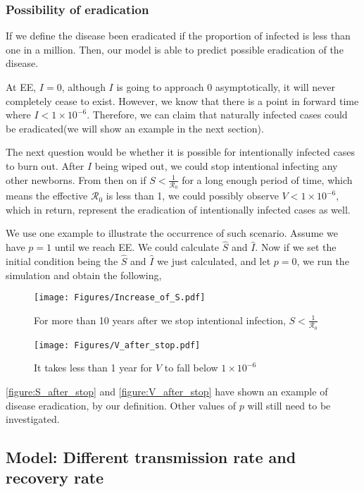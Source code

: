 \documentclass[12pt]{article}
\newcommand{\R}{\mathcal{R}}
\begin{document}
\subsubsection{Possibility of eradication}
If we define the disease been eradicated if the proportion of infected is less than one in a million. Then, our model is able to predict possible eradication of the disease.

At EE, $I=0$, although $I$ is going to approach 0 asymptotically, it will never completely cease to exist. However, we know that there is a point in forward time where $I<1\times10^{-6}$. Therefore, we can claim that naturally infected cases could be eradicated(we will show an example in the next section).

The next question would be whether it is possible for intentionally infected cases to burn out. After $I$ being wiped out, we could stop intentional infecting any other newborns. From then on if $S<\frac{1}{\R_0}$ for a long enough period of time, which means the effective $\R_0$ is less than 1, we could possibly observe $V<1\times10^{-6}$, which in return, represent the eradication of intentionally infected cases as well.

We use one example to illustrate the occurrence of such scenario. Assume we have $p=1$ until we reach EE. We could calculate $\hat{S}$ and $\hat{I}$. Now if we set the initial condition being the $\hat{S}$ and $\hat{I}$ we just calculated, and let $p=0$, we run the simulation and obtain the following,
\begin{figure}[H]
  \centering
  \texttt{[image: Figures/Increase\_of\_S.pdf]}
  \caption{For more than 10 years after we stop intentional infection, $S<\frac{1}{\R_0}$}
\label{figure:S_after_stop}
\end{figure}

\begin{figure}[H]
  \centering
  \texttt{[image: Figures/V\_after\_stop.pdf]}
  \caption{It takes less than 1 year for $V$ to fall below $1\times10^{-6}$}
\label{figure:V_after_stop}
\end{figure}

\autoref{figure:S_after_stop} and \autoref{figure:V_after_stop} have shown an example of disease eradication, by our definition. Other values of $p$ will still need to be investigated.

\subsection{Model: Different transmission rate and recovery rate}
\end{document}
